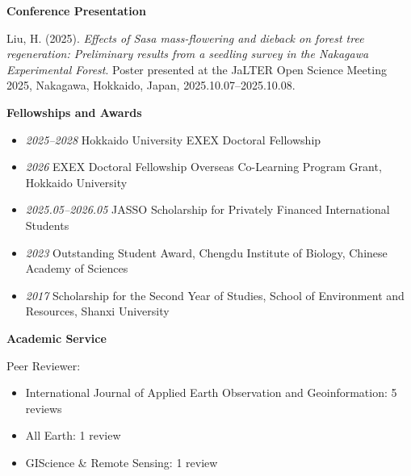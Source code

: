 \documentclass[10.5pt,a4paper]{article}
\newcommand{\cvsection}[1]{\par\vspace{1.1em}\textbf{#1}\par\vspace{0.45em}}
\begin{document}
\cvsection{Conference Presentation}
Liu, H. (2025). \textit{Effects of Sasa mass-flowering and dieback on forest tree regeneration: Preliminary results from a seedling survey in the Nakagawa Experimental Forest}. Poster presented at the JaLTER Open Science Meeting 2025, Nakagawa, Hokkaido, Japan, 2025.10.07--2025.10.08.

\cvsection{Fellowships and Awards}
\begin{itemize}
  \item \textit{2025--2028} \quad Hokkaido University EXEX Doctoral Fellowship
  \item \textit{2026} \quad EXEX Doctoral Fellowship Overseas Co-Learning Program Grant, Hokkaido University
  \item \textit{2025.05--2026.05} \quad JASSO Scholarship for Privately Financed International Students
  \item \textit{2023} \quad Outstanding Student Award, Chengdu Institute of Biology, Chinese Academy of Sciences
  \item \textit{2017} \quad Scholarship for the Second Year of Studies, School of Environment and Resources, Shanxi University
\end{itemize}

\cvsection{Academic Service}
Peer Reviewer:
\begin{itemize}
  \item International Journal of Applied Earth Observation and Geoinformation: 5 reviews
  \item All Earth: 1 review
  \item GIScience \& Remote Sensing: 1 review
\end{itemize}
\end{document}
